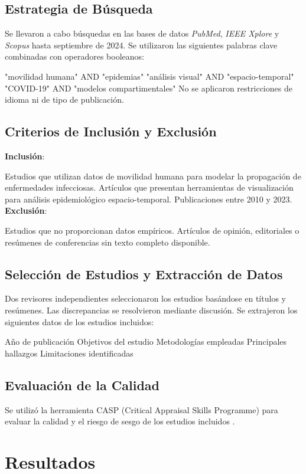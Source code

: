 \documentclass[sigconf]{acmart}
\begin{document}
\subsection{Estrategia de Búsqueda}

Se llevaron a cabo búsquedas en las bases de datos \textit{PubMed}, \textit{IEEE Xplore} y \textit{Scopus} hasta septiembre de 2024. Se utilizaron las siguientes palabras clave combinadas con operadores booleanos:

"movilidad humana" AND "epidemias"
"análisis visual" AND "espacio-temporal"
"COVID-19" AND "modelos compartimentales"
No se aplicaron restricciones de idioma ni de tipo de publicación.

\subsection{Criterios de Inclusión y Exclusión}

\textbf{Inclusión}:

Estudios que utilizan datos de movilidad humana para modelar la propagación de enfermedades infecciosas.
Artículos que presentan herramientas de visualización para análisis epidemiológico espacio-temporal.
Publicaciones entre 2010 y 2023.
\textbf{Exclusión}:

Estudios que no proporcionan datos empíricos.
Artículos de opinión, editoriales o resúmenes de conferencias sin texto completo disponible.
\subsection{Selección de Estudios y Extracción de Datos}

Dos revisores independientes seleccionaron los estudios basándose en títulos y resúmenes. Las discrepancias se resolvieron mediante discusión. Se extrajeron los siguientes datos de los estudios incluidos:

Año de publicación
Objetivos del estudio
Metodologías empleadas
Principales hallazgos
Limitaciones identificadas
\subsection{Evaluación de la Calidad}

Se utilizó la herramienta CASP (Critical Appraisal Skills Programme) para evaluar la calidad y el riesgo de sesgo de los estudios incluidos \cite{casp2018}.

\section{Resultados}
\end{document}
